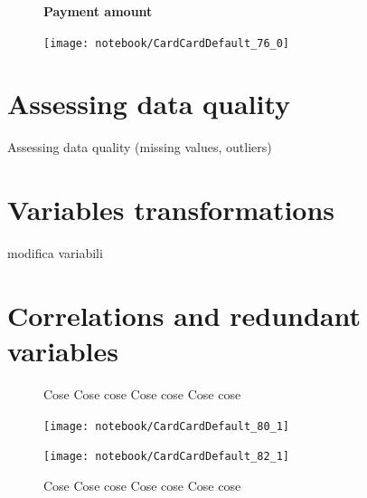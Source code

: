 \documentclass[11pt,a4paper]{report}
\begin{document}
\smallskip
\begin{figure}[h]
  \begin{minipage}[h]{.40\textwidth}
        {\Large \textbf{Payment amount}}
        

  \end{minipage}
  \begin{minipage}[h]{.60\textwidth}
    \texttt{[image: notebook/CardCardDefault\_76\_0]}
  \end{minipage}
\end{figure}

\clearpage
\section{Assessing data quality}

Assessing data quality (missing values, outliers)

\section{Variables transformations}

modifica variabili
\clearpage

\section{Correlations and redundant variables}

\begin{figure}[h]
  \begin{minipage}[h]{.40\textwidth}
        Cose Cose cose Cose cose Cose cose
  \end{minipage}
  \begin{minipage}[h]{.60\textwidth}
    \texttt{[image: notebook/CardCardDefault\_80\_1]}
  \end{minipage}
\end{figure}


\begin{figure}[h]
  \begin{minipage}[h]{.60\textwidth}
    \texttt{[image: notebook/CardCardDefault\_82\_1]}
  \end{minipage}
  \begin{minipage}[h]{.40\textwidth}
        Cose Cose cose Cose cose Cose cose
  \end{minipage}
\end{figure}
\end{document}
